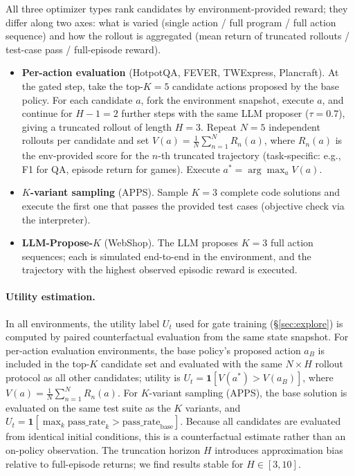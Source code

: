 All three optimizer types rank candidates by environment-provided
reward; they differ along two axes: what is varied (single action /
full program / full action sequence) and how the rollout is
aggregated (mean return of truncated rollouts / test-case pass /
full-episode reward).
\begin{itemize}[leftmargin=*,nosep]
\item \textbf{Per-action evaluation} (HotpotQA, FEVER, TWExpress,
  Plancraft). At the gated step, take the top-$K{=}5$ candidate
  actions proposed by the base policy. For each candidate $a$, fork
  the environment snapshot, execute $a$, and continue for $H{-}1{=}2$
  further steps with the same LLM proposer ($\tau{=}0.7$), giving a
  truncated rollout of length $H{=}3$. Repeat $N{=}5$ independent
  rollouts per candidate and set
  $V(a) = \tfrac{1}{N}\sum_{n=1}^{N} R_n(a)$, where $R_n(a)$ is the
  env-provided score for the $n$-th truncated trajectory (task-specific:
  e.g., F1 for QA, episode return for games). Execute
  $a^{*} = \arg\max_{a} V(a)$.
\item \textbf{$K$-variant sampling} (APPS). Sample $K{=}3$ complete
  code solutions and execute the first one that passes the provided
  test cases (objective check via the interpreter).
\item \textbf{LLM-Propose-$K$} (WebShop). The LLM proposes $K{=}3$
  full action sequences; each is simulated end-to-end in the
  environment, and the trajectory with the highest observed
  episodic reward is executed.
\end{itemize}
\paragraph{Utility estimation.}
In all environments, the utility label $U_t$ used for gate
training (\S\ref{sec:explore}) is computed by paired
counterfactual evaluation from the same state snapshot.
For per-action evaluation environments, the base policy's
proposed action $a_B$ is included in the top-$K$ candidate set
and evaluated with the same $N{\times}H$ rollout protocol as all
other candidates; utility is
$U_t = \mathbf{1}[V(a^*) > V(a_B)]$, where
$V(a) = \tfrac{1}{N}\sum_{n=1}^{N} R_n(a)$.
For $K$-variant sampling (APPS), the base solution is evaluated
on the same test suite as the $K$ variants, and
$U_t = \mathbf{1}[\max_k \text{pass\_rate}_k > \text{pass\_rate}_{\text{base}}]$.
Because all candidates are evaluated from identical initial
conditions, this is a counterfactual estimate rather than an
on-policy observation. The truncation horizon $H$ introduces
approximation bias relative to full-episode returns; we find
results stable for $H \in [3, 10]$.

